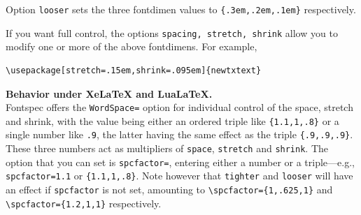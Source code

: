\documentclass[\fsc]{article}
\theoremstyle{oldplain}
\theoremstyle{plain}
\begin{document}
Option {\tt looser} sets the three fontdimen values to \verb|{.3em,.2em,.1em}| respectively. 

If you want full control, the options {\tt spacing, stretch, shrink} allow you to modify one or more of the above fontdimens. For example,
\begin{verbatim}
\usepackage[stretch=.15em,shrink=.095em]{newtxtext}
\end{verbatim}

\textbf{Behavior under XeLaTeX and LuaLaTeX.}\\
Fontspec  offers the {\tt WordSpace=} option for individual control of the space, stretch and shrink, with the value being either an ordered triple like \verb|{1.1,1,.8}| or a single number like {\tt .9}, the latter having the same effect as the triple \verb|{.9,.9,.9}|. These three numbers act as multipliers of {\tt space}, {\tt stretch} and {\tt shrink}. The option that you can set is {\tt spcfactor=}, entering either a number or a triple---e.g., {\tt spcfactor=1.1} or \verb|{1.1,1,.8}|. Note however that {\tt tighter} and {\tt looser} will have an effect if {\tt spcfactor} is not set, amounting to \verb|\spcfactor={1,.625,1}| and \verb|\spcfactor={1.2,1,1}| respectively.
\end{document}

